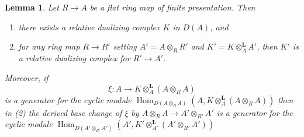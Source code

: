 \documentclass{amsart}
\theoremstyle{plain}
\newtheorem{lemma}[subsection]{Lemma}
\theoremstyle{definition}
\theoremstyle{remark}
\numberwithin{equation}{subsection}
\def\Hom{\mathop{\mathrm{Hom}}\nolimits}
\begin{document}
\begin{lemma}
\label{lemma-base-change-relative-dualizing}
Let $R \to A$ be a flat ring map of finite presentation. Then
\begin{enumerate}
\item there exists a relative dualizing complex $K$ in $D(A)$, and
\item for any ring map $R \to R'$ setting $A' = A \otimes_R R'$
and $K' = K \otimes_A^\mathbf{L} A'$, then $K'$ is a
relative dualizing complex for $R' \to A'$.
\end{enumerate}
Moreover, if
$$
\xi : A \longrightarrow K \otimes_A^\mathbf{L} (A \otimes_R A)
$$
is a generator for the cyclic module
$\Hom_{D(A \otimes_R A)}(A, K \otimes_A^\mathbf{L} (A \otimes_R A))$
then in (2) the derived base change of $\xi$ by
$A \otimes_R A \to A' \otimes_{R'} A'$ is a generator for
the cyclic module
$\Hom_{D(A' \otimes_{R'} A')}(A',
K' \otimes_{A'}^\mathbf{L} (A' \otimes_{R'} A'))$
\end{lemma}
\end{document}
